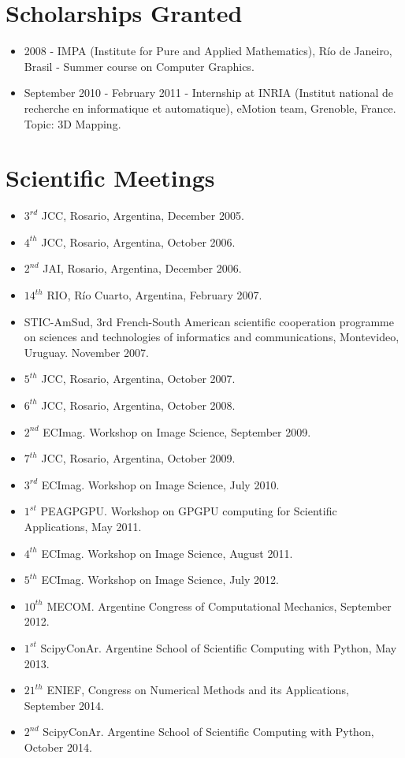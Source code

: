 \documentclass[a4paper,12pt]{article}
\begin{document}
\section*{Scholarships Granted}

\begin{itemize}
\item 2008 - IMPA (Institute for Pure and Applied Mathematics), R\'io de Janeiro, Brasil - Summer course on Computer Graphics.
\item September 2010 - February 2011 - Internship at INRIA (Institut national de recherche en informatique et automatique), eMotion team, Grenoble, France. Topic: 3D Mapping.
\end{itemize}


\section*{Scientific Meetings}
\begin{small}
\begin{itemize}
\item $3^{rd}$ JCC, Rosario, Argentina, December 2005.
\item $4^{th}$ JCC, Rosario, Argentina, October 2006.
\item $2^{nd}$ JAI, Rosario, Argentina, December 2006.
\item $14^{th}$ RIO, R\'io Cuarto, Argentina, February 2007.
\item STIC-AmSud, 3rd French-South American scientific cooperation programme on sciences and technologies of informatics and communications, Montevideo, Uruguay. November 2007.
\item $5^{th}$ JCC, Rosario, Argentina, October 2007.
\item $6^{th}$ JCC, Rosario, Argentina, October 2008.
\item $2^{nd}$ ECImag. Workshop on Image Science, September 2009.
\item $7^{th}$ JCC, Rosario, Argentina, October 2009.
\item $3^{rd}$ ECImag. Workshop on Image Science, July 2010.
\item $1^{st}$ PEAGPGPU. Workshop on GPGPU computing for Scientific Applications, May 2011.
\item $4^{th}$ ECImag. Workshop on Image Science, August 2011.
\item $5^{th}$ ECImag. Workshop on Image Science, July 2012.
\item $10^{th}$ MECOM. Argentine Congress of Computational Mechanics, September 2012.
\item $1^{st}$ ScipyConAr. Argentine School of Scientific Computing with Python, May 2013.
\item $21^{th}$ ENIEF,  Congress on Numerical Methods and its Applications, September 2014.
\item $2^{nd}$ ScipyConAr. Argentine School of Scientific Computing with Python, October 2014.
\end{itemize}
\end{small}
\end{document}
